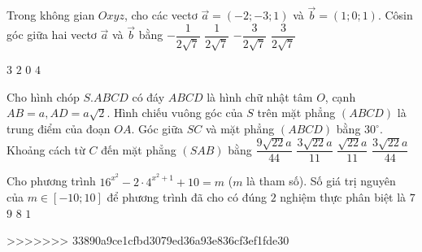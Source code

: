 \begin{ex}%
Trong không gian $O x y z$, cho các vectơ $\vec{a}=(-2;-3; 1)$ và $\vec{b}= (1; 0; 1)$. Côsin góc giữa hai vectơ $\vec{a}$ và $\vec{b}$ bằng
\choice
{\True $-\dfrac{1}{2\sqrt{7}}$}
{$\dfrac{1}{2\sqrt{7}}$}
{$-\dfrac{3}{2\sqrt{7}}$}
{$\dfrac{3}{2\sqrt{7}}$}

\end{ex}
\begin{ex}%
{\vspace{-0.5cm}

}
\choice
{$3$}
{\True $2$}
{$0$}
{$4$}
\end{ex}
\begin{ex}%
Cho hình chóp $S.ABCD$ có đáy $ABCD$ là hình chữ nhật tâm $O$, cạnh $AB=a, AD=a \sqrt{2}$. Hình chiếu vuông góc của $S$ trên mặt phẳng $(ABCD)$ là trung điểm của đoạn $OA$. Góc giữa $SC$ và mặt phẳng $(ABCD)$ bằng $30^{\circ}$. Khoảng cách từ $C$ đến mặt phẳng $(SAB)$ bằng
\choice
{$\dfrac{9\sqrt{22} a}{44}$}
{\True $\dfrac{3\sqrt{22} a}{11}$}
{$\dfrac{\sqrt{22} a}{11}$}
{$\dfrac{3\sqrt{22} a}{44}$}

\end{ex}
\begin{ex}%
Cho phương trình $16^{x^2}-2\cdot 4^{x^2+1}+10=m$ ($m$ là tham số). Số giá trị nguyên của $m \in[-10; 10]$ để phương trình đã cho có đúng $2$ nghiệm thực phân biệt là
\choice
{$7$}
{\True $9$}
{$8$}
{$1$}

\end{ex}

>>>>>>> 33890a9ce1cfbd3079ed36a93e836cf3ef1fde30
